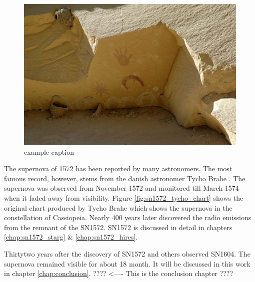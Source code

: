 \begin{figure}[htbp] %
   \centering
   \includegraphics[width=\textwidth]{chapter_intro/plots/Chaco_canyon_pueblo_bonito_petroglyphs.jpg} 
   \caption{example caption}
   \label{fig:sn1006_chaco}
\end{figure}


The supernova of 1572 has been reported by many astronomers. The most famous record, however, stems from the danish astronomer Tycho Brahe \citep{1602QB41.B73.......}. The supernova was observed from November 1572 and monitored till March 1574 when it faded away from visibility. Figure \ref{fig:sn1572_tycho_chart} shows the original chart produced by Tycho Brahe which shows the supernova in the constellation of Cassiopeia. Nearly 400 years later \citet{1952Natur.170..364H} discovered the radio emissions from the remnant of the SN1572. 
SN1572 is discussed in detail in chapters \ref{chap:sn1572_starg} \& \ref{chap:sn1572_hires}.

Thirtytwo years after the discovery of SN1572 \citet{kepler1606} and others observed SN1604. The supernova remained visible for about 18 month. It will be discussed in this work in chapter \ref{chap:conclusion}. ???? <---- This is the conclusion chapter ????

